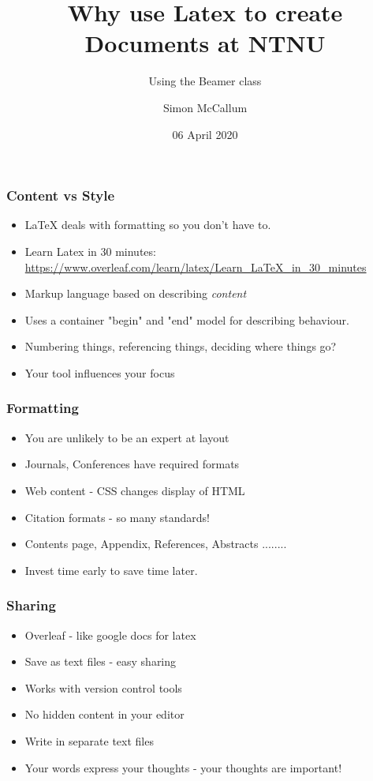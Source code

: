 \documentclass[screen, aspectratio=43]{beamer}
\title[Latex Document]{Why use Latex to create \\Documents at NTNU}
\subtitle{Using the Beamer class}
\author[S. McCallum]{Simon McCallum}
\institute[NTNU]{Department of Computer Sciences, NTNU}
\date{06 April 2020}
\begin{document}
\begin{frame}
  \titlepage
\end{frame}


\begin{frame}
  \frametitle{Content vs Style}
  \begin{itemize}
      \item {\LaTeX} deals with formatting so you don't have to.
      \item Learn Latex in 30 minutes: \url{https://www.overleaf.com/learn/latex/Learn_LaTeX_in_30_minutes}
      \item Markup language based on describing \emph{content}
      \item Uses a container "begin" and "end" model for describing behaviour.
      \item Numbering things, referencing things, deciding where things go?
      \item Your tool influences your focus
  \end{itemize}
\end{frame}

\begin{frame}
  \frametitle{Formatting}
  \begin{itemize}
      \item You are unlikely to be an expert at layout
      \item Journals, Conferences have required formats
      \item Web content - CSS changes display of HTML
      \item Citation formats - so many standards!
      \item Contents page, Appendix, References, Abstracts ........
      \item Invest time early to save time later.
  \end{itemize}
\end{frame}


\begin{frame}
  \frametitle{Sharing}
  \begin{itemize}
      \item Overleaf - like google docs for latex
      \item Save as text files - easy sharing
      \item Works with version control tools
      \item No hidden content in your editor
      \item Write in separate text files
      \item Your words express your thoughts - your thoughts are important!
  \end{itemize}
\end{frame}
\end{document}
